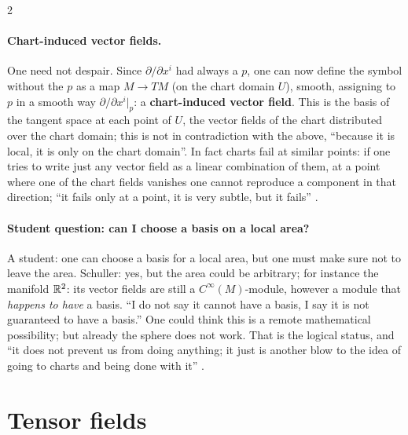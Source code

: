 \begin{paracol}{2}
\paragraph{Chart-induced vector fields.} One need not despair. Since $\partial/\partial x^i$ had always a $p$, one can now define the symbol without the $p$ as a map $M\to TM$ (on the chart domain $U$), smooth, assigning to $p$ in a smooth way $\partial/\partial x^i|_p$: a \textbf{chart-induced vector field}. This is the basis of the tangent space at each point of $U$, the vector fields of the chart distributed over the chart domain; this is not in contradiction with the above, ``because it is local, it is only on the chart domain''. In fact charts fail at similar points: if one tries to write just any vector field as a linear combination of them, at a point where one of the chart fields vanishes one cannot reproduce a component in that direction;
``it fails only at a point, it is very subtle, but it fails'' .

\paragraph{Student question: can I choose a basis on a local area?} A student: one can choose a basis for a local area, but one must make sure not to leave the area. Schuller: yes, but the area could be arbitrary; for instance the manifold $\mathbb{R}^2$: its vector fields are still a $C^\infty(M)$-module, however a module that \emph{happens to have} a basis. ``I do not say it cannot have a basis, I say it is not guaranteed to have a basis.'' One could think this is a remote mathematical possibility; but already the sphere does not work. That is the logical status, and ``it does not prevent us from doing anything; it just is another blow to the idea of going to charts and being done with it''
.

\section{Tensor fields}\label{sec:c06-tensorfields}


\end{paracol}
